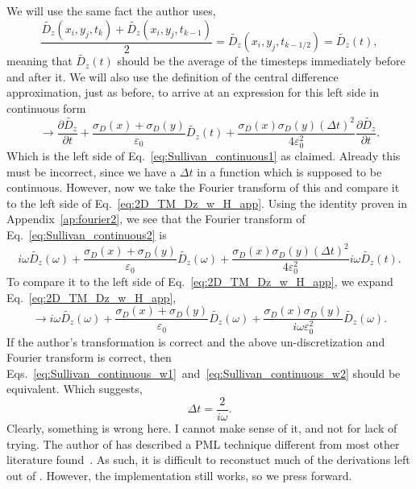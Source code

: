 \documentclass[12pt]{article}
\begin{document}
We will use the same fact the author uses,
\begin{equation}
\frac{\tilde{D_z}(x_i,y_j,t_k)+\tilde{D_z}(x_i,y_j,t_{k-1})}{2} = \tilde{D_z}(x_i,y_j,t_{k-1/2}) = \tilde{D_z}(t),
\end{equation}
meaning that $\tilde{D_z}(t)$ should be the average of the timesteps immediately before and after it. We will also use the definition of the central difference approximation, just as before, to arrive at an expression for this left side in continuous form
\begin{equation}
\label{eq:Sullivan_continuous2}
\rightarrow \frac{\partial\tilde{D_z}}{\partial t} + \frac{\sigma_D(x)+\sigma_D(y)}{\varepsilon_0}\tilde{D_z}(t) +\frac{\sigma_D(x)\sigma_D(y)\left(\Delta t\right)^2}{4\varepsilon_0^2}\frac{\partial \tilde{D_z}}{\partial t}.
\end{equation}
Which is the left side of Eq.~\ref{eq:Sullivan_continuous1} as claimed. Already this must be incorrect, since we have a $\Delta t$ in a function which is supposed to be continuous. However, now we take the Fourier transform of this and compare it to the left side of Eq.~\ref{eq:2D_TM_Dz_w_H_app}. Using the identity proven in Appendix~\ref{ap:fourier2}, we see that the Fourier transform of Eq.~\ref{eq:Sullivan_continuous2} is
\begin{equation}
\label{eq:Sullivan_continuous_w1}
i\omega\tilde{D_z}(\omega)+\frac{\sigma_D(x)+\sigma_D(y)}{\varepsilon_0}\tilde{D_z}(\omega) + \frac{\sigma_D(x)\sigma_D(y)\left(\Delta t\right)^2}{4\varepsilon_0^2}i\omega\tilde{D_z}(t).
\end{equation}
To compare it to the left side of Eq.~\ref{eq:2D_TM_Dz_w_H_app}, we expand Eq.~\ref{eq:2D_TM_Dz_w_H_app},
\begin{equation}
\label{eq:Sullivan_continuous_w2}
\rightarrow i\omega\tilde{D_z}(\omega)+\frac{\sigma_D(x)+\sigma_D(y)}{\varepsilon_0}\tilde{D_z}(\omega)+\frac{\sigma_D(x)\sigma_D(y)}{i\omega\varepsilon_0^2}\tilde{D_z}(\omega).
\end{equation}
If the author's transformation is correct and the above un-discretization and Fourier transform is correct, then Eqs.~\ref{eq:Sullivan_continuous_w1}~and~\ref{eq:Sullivan_continuous_w2} should be equivalent. Which suggests,
\begin{equation}
\Delta t = \frac{2}{i\omega}.
\end{equation}
Clearly, something is wrong here. I cannot make sense of it, and not for lack of trying. The author of \cite{Sullivan00} has described a PML technique different from most other literature found~\cite{Schneider10,Taflove00}. As such, it is difficult to reconstuct much of the derivations left out of \cite{Sullivan00}. However, the implementation still works, so we press forward.
\newpage
\end{document}
